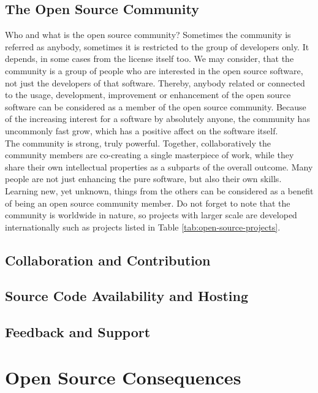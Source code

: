 \documentclass[11pt,a4paper]{article}
\theoremstyle{definition}
\begin{document}
    \subsection{The Open Source Community}

    Who and what is the open source community? Sometimes the community is referred as anybody, sometimes it is restricted to the group of developers only. It depends, in some cases from the license itself too. We may consider, that the community is a group of people who are interested in the open source software, not just the developers of that software. Thereby, anybody related or connected to the usage, development, improvement or enhancement of the open source software can be considered as a member of the open source community. Because of the increasing interest for a software by absolutely anyone, the community has uncommonly fast grow, which has a positive affect on the software itself.\\

    The community is strong, truly powerful. Together, collaboratively the community members are co-creating a single masterpiece of work, while they share their own intellectual properties as a subparts of the overall outcome. Many people are not just enhancing the pure software, but also their own skills. Learning new, yet unknown, things from the others can be considered as a benefit of being an open source community member. Do not forget to note that the community is worldwide in nature, so projects with larger scale are developed internationally such as projects listed in Table \ref{tab:open-source-projects}.

    \subsection{Collaboration and Contribution}

    \subsection{Source Code Availability and Hosting}

    \subsection{Feedback and Support}

\section{Open Source Consequences}
\end{document}
